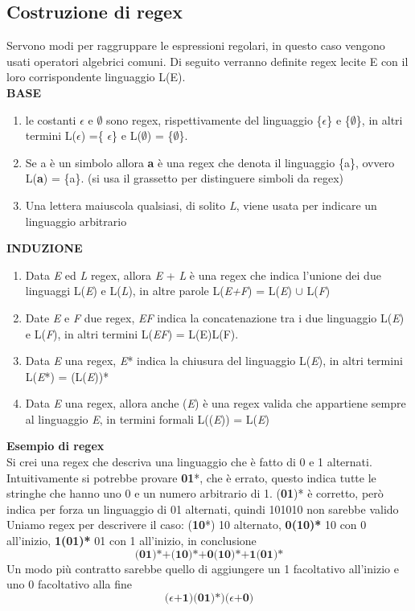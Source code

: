 \documentclass[12pt]{article}
\begin{document}
\subsection{Costruzione di regex}
Servono modi per raggruppare le espressioni regolari, in questo caso vengono usati operatori algebrici comuni. Di seguito verranno definite regex lecite E con il loro corrispondente linguaggio L(E). 
\\ \textbf{BASE}
\begin{enumerate}
  \item le costanti $\epsilon$ e $\emptyset$ sono regex, rispettivamente del linguaggio \{$\epsilon$\} e \{$\emptyset$\}, in altri termini L($\epsilon$) =\{ $\epsilon$\} e L($\emptyset$) = \{$\emptyset$\}.
  \item Se a è un simbolo allora \textbf{a} è una regex che denota il linguaggio \{a\}, ovvero L(\textbf{a}) = \{a\}. (si usa il grassetto per distinguere simboli da regex)
  \item Una lettera maiuscola qualsiasi, di solito \emph{L}, viene usata per indicare un linguaggio arbitrario
\end{enumerate}
\textbf{INDUZIONE}
\begin{enumerate}
  \item Data \emph{E} ed \emph{L} regex, allora \emph{E} + \emph{L} è una regex che indica l'unione dei due linguaggi L(\emph{E}) e L(\emph{L}), in altre parole L(\emph{E+F}) = L(\emph{E}) $\cup$ L(\emph{F})
  \item Date \emph{E} e \emph{F} due regex, \emph{EF} indica la concatenazione tra i due linguaggio L(\emph{E}) e L(\emph{F}), in altri termini L(\emph{EF}) = L(E)L(F).
  \item Data \emph{E} una regex, \emph{E}* indica la chiusura del linguaggio L(\emph{E}), in altri termini L(\emph{E}*) = (L(\emph{E}))*
  \item Data \emph{E} una regex, allora anche (\emph{E}) è una regex valida che appartiene sempre al linguaggio \emph{E}, in termini formali L((\emph{E})) = L(\emph{E})
\end{enumerate}
\textbf{Esempio di regex} 
\\ Si crei una regex che descriva una linguaggio che è fatto di 0 e 1 alternati.
\\ Intuitivamente si potrebbe provare \textbf{01}*, che è errato, questo indica tutte le stringhe che hanno uno 0 e un numero arbitrario di 1. (\textbf{01})* è corretto, però indica per forza un linguaggio di 01 alternati, quindi 101010 non sarebbe valido 
\\ Uniamo regex per descrivere il caso: (\textbf{10}*) 10 alternato, 
\textbf{0(10)*} 10 con 0 all'inizio, 
\textbf{1(01)*} 01 con 1 all'inizio,
in conclusione 
\[\textbf{(01)*+(10)*+0(10)*+1(01)*}\]
Un modo più contratto sarebbe quello di aggiungere un 1 facoltativo all'inizio e uno 0 facoltativo alla fine
\[\textbf{($\epsilon$+1)(01)*)($\epsilon$+0)}\]
\end{document}
